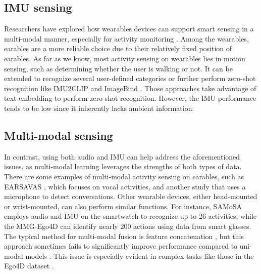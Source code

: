 \subsection{IMU sensing}
Researchers have explored how wearables devices can support smart sensing in a multi-modal manner, especially for activity monitoring \cite{min2018exploring,stromback2020mm, roddiger2022sensing, lyu2024earda, mollyn2022samosa, bhattacharya2022leveraging,duan2024f2key}. Among the wearables, earables are a more reliable choice due to their relatively fixed position of earables. As far as we know, most activity sensing on wearables lies in motion sensing, such as determining whether the user is walking or not. It can be extended to recognize several user-defined categories or further perform zero-shot recognition like IMU2CLIP and ImageBind \cite{tong2021zero, moon2023imu2clip, girdhar2023imagebind}. Those approaches take advantage of text embedding to perform zero-shot recognition. However, the IMU performance tends to be low since it inherently lacks ambient information.

\subsection{Multi-modal sensing}
In contrast, using both audio and IMU can help address the aforementioned issues, as multi-modal learning leverages the strengths of both types of data. There are some examples of multi-modal activity sensing on earables, such as EARSAVAS \cite{zhang2024earsavas}, which focuses on vocal activities, and another study \cite{min2018exploring} that uses a microphone to detect conversations. Other wearable devices, either head-mounted or wrist-mounted, can also perform similar functions. For instance, SAMoSA \cite{mollyn2022samosa, bhattacharya2022leveraging} employs audio and IMU on the smartwatch to recognize up to 26 activities, while the MMG-Ego4D \cite{gong2023mmg} can identify nearly 200 actions using data from smart glasses.
The typical method for multi-modal fusion is feature concatenation \cite{he2023towards, duan2024earse}, but this approach sometimes fails to significantly improve performance compared to uni-modal models \cite{gong2023mmg, huang2022modality}. This issue is especially evident in complex tasks like those in the Ego4D dataset \cite{grauman2022ego4d}. 

